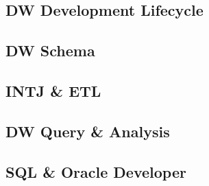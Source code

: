 \documentclass[
  a4paper,
]{article}
\begin{document}
\hypertarget{dw-development-lifecycle}{%
\subsection{DW Development Lifecycle}\label{dw-development-lifecycle}}

\hypertarget{dw-schema}{%
\subsection{DW Schema}\label{dw-schema}}

\hypertarget{intj-etl}{%
\subsection{INTJ \& ETL}\label{intj-etl}}

\hypertarget{dw-query-analysis}{%
\subsection{DW Query \& Analysis}\label{dw-query-analysis}}

\hypertarget{sql-oracle-developer}{%
\subsection{SQL \& Oracle Developer}\label{sql-oracle-developer}}

\printbibliography
\end{document}
